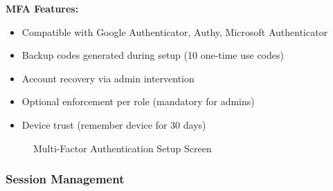 \textbf{MFA Features:}
\begin{itemize}
    \item Compatible with Google Authenticator, Authy, Microsoft Authenticator
    \item Backup codes generated during setup (10 one-time use codes)
    \item Account recovery via admin intervention
    \item Optional enforcement per role (mandatory for admins)
    \item Device trust (remember device for 30 days)
\end{itemize}

\begin{figure}[h]
\centering
{}
\caption{Multi-Factor Authentication Setup Screen}
\label{fig:mfa-setup}
\end{figure}

\subsubsection{Session Management}

